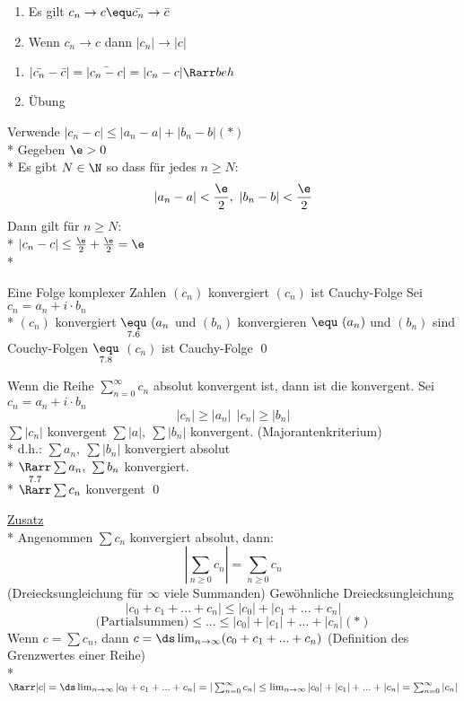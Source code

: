 
\bem
\begin{enumerate}
\item{Es gilt $c_n \to c \equ \bar{c_n} \to \bar{c}$}
\item{Wenn $c_n \to c$ dann $|c_n| \to |c|$}
\end{enumerate}
\bew
\begin{enumerate}
\item{$|\bar{c_n} - \bar{c}| = |\bar{c_n - c}| = |c_n - c| \Rarr beh$}
\item{Übung}
\end{enumerate}


\item[$",\Larr"'$]{Verwende $|c_n - c| \leq |a_n - a| + |b_n - b| (*)$\\*
Gegeben $\e > 0$\\*
Es gibt $N \in \N$ so dass für jedes $n \geq N$:\\
$$|a_n - a| < \frac{\e}{2}, \ |b_n - b| < \frac{\e}{2}$$
Dann gilt für $n \geq N$:\\*
$|c_n - c| \leq \frac{\e}{2} + \frac{\e}{2} = \e$\\*}


Eine Folge komplexer Zahlen $(c_n)$ konvergiert \equ{} $(c_n)$ ist Cauchy-Folge
\bew
	Sei $c_n = a_n + i \cdot b_n$\\*
	$(c_n)$ konvergiert $\underset{7.6}{\equ} \ (a_n$ und $(b_n)$ konvergieren $\equ \ (a_n)$ und $(b_n)$ sind Couchy-Folgen $\underset{7.8}{\equ}$ $(c_n)$ ist Cauchy-Folge \qed


Wenn die Reihe $\sum_{n = 0}^{\infty} c_n$ absolut konvergent ist, dann ist die konvergent.
\bew
Sei $c_n = a_n + i \cdot b_n$ $$|c_n| \geq |a_n|\ \ |c_n| \geq |b_n|$$
$\sum |c_n|$ konvergent \Rarr $\sum |a|,\ \sum |b_n|$ konvergent. (Majorantenkriterium)\\*
d.h.: $\sum a_n,\ \sum |b_n|$ konvergiert absolut\\*
$\Rarr \sum a_n,\ \sum b_n$ konvergiert.\\*
$\overset{7.7}{\Rarr} \sum c_n$ konvergent \qed

\ul{Zusatz}\\*
Angenommen $\sum c_n$ konvergiert absolut, dann: 
$$|\sum_{n \geq 0} c_n| = \sum_{n \geq 0} c_n$$
(Dreiecksungleichung für $\infty$ viele Summanden)
\bew
Gewöhnliche Dreiecksungleichung \Rarr
$$|c_0 + c_1 + ... + c_n| \leq |c_0| + |c_1 + ... + c_n|$$
$$\text{(Partialsummen)} \leq ... \leq |c_0| + |c_1| + ... + |c_n| (*)$$
Wenn $c = \sum c_n$, dann $c = \ds\lim_{n \to \infty} (c_0 + c_1 + ... + c_n)$ (Definition des Grenzwertes einer Reihe)\\*
$\Rarr |c| = \ds\lim_{n \to \infty} |c_0 + c_1 + ... + c_n| = |\sum_{n = 0}^{\infty} c_n| \leq \lim_{n \to \infty} |c_0| + |c_1| + ... + |c_n| = \sum_{n = 0}^{\infty} |c_n|$